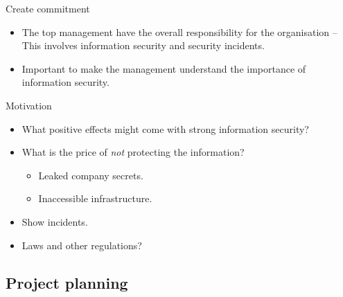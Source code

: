 \documentclass{beamer}
\begin{document}
\begin{frame}{Create commitment}
  \begin{itemize}
    \item The top management have the overall responsibility for the
      organisation -- This involves information security and security incidents.
      
    \item Important to make the management understand the importance of
      information security.

  \end{itemize}
\end{frame}

\begin{frame}{Motivation}
  \begin{itemize}
    \item What positive effects might come with strong information security?

    \item What is the price of \emph{not} protecting the information?
      \begin{itemize}
        \item Leaked company secrets.
        \item Inaccessible infrastructure.
      \end{itemize}

    \item Show incidents.

    \item Laws and other regulations?

  \end{itemize}
\end{frame}

\subsection{Project planning}
\end{document}
